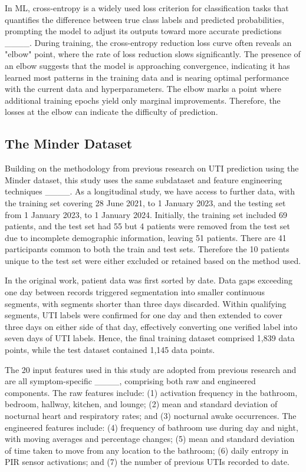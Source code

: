 In \gls{ML}, cross-entropy is a widely used loss criterion for classification tasks that quantifies the difference between true class labels and predicted probabilities, prompting the model to adjust its outputs toward more accurate predictions ____. During training, the cross-entropy reduction loss curve often reveals an "elbow" point, where the rate of loss reduction slows significantly. The presence of an elbow suggests that the model is approaching convergence, indicating it has learned most patterns in the training data and is nearing optimal performance with the current data and hyperparameters. The elbow marks a point where additional training epochs yield only marginal improvements. Therefore, the losses at the elbow can indicate the difficulty of prediction.


\subsection{The Minder Dataset}

Building on the methodology from previous research on \gls{UTI} prediction using the Minder dataset, this study uses the same subdataset and feature engineering techniques ____. As a longitudinal study, we have access to further data, with the training set covering 28 June 2021, to 1 January 2023, and the testing set from 1 January 2023, to 1 January 2024. Initially, the training set included 69 patients, and the test set had 55 but 4 patients were removed from the test set due to incomplete demographic information, leaving 51 patients. There are 41 participants common to both the train and test sets. Therefore the 10 patients unique to the test set were either excluded or retained based on the method used.

In the original work, patient data was first sorted by date. Data gaps exceeding one day between records triggered segmentation into smaller continuous segments, with segments shorter than three days discarded. Within qualifying segments, \gls{UTI} labels were confirmed for one day and then extended to cover three days on either side of that day, effectively converting one verified label into seven days of \gls{UTI} labels. Hence, the final training dataset comprised 1,839 data points, while the test dataset contained 1,145 data points.

The 20 input features used in this study are adopted from previous research and are all symptom-specific ____, comprising both raw and engineered components. The raw features include: (1) activation frequency in the bathroom, bedroom, hallway, kitchen, and lounge; (2) mean and standard deviation of nocturnal heart and respiratory rates; and (3) nocturnal awake occurrences. The engineered features include: (4) frequency of bathroom use during day and night, with moving averages and percentage changes; (5) mean and standard deviation of time taken to move from any location to the bathroom; (6) daily entropy in \gls{PIR} sensor activations; and (7) the number of previous \gls{UTI}s recorded to date.